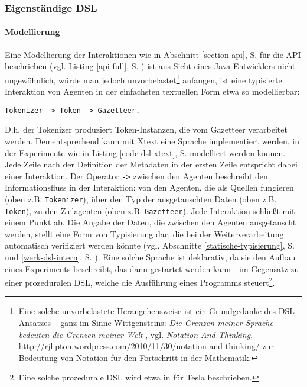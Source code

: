 \documentclass[abstracton, 12pt]{scrartcl}
\begin{document}
\subsubsection{Eigenständige DSL} \label{werk-dsl-extern}  

\paragraph{Modellierung}

Eine Modellierung der Interaktionen wie in Abschnitt \ref{section-api}, S. \pageref{section-api} für die API beschrieben (vgl. Listing \ref{api-full}, S. \pageref{api-full}) ist aus Sicht eines Java-Entwicklers nicht ungewöhnlich, würde man jedoch unvorbelastet\footnote{Eine solche unvorbelastete Herangehensweise ist ein Grundgedanke des DSL-Ansatzes -- ganz im Sinne Wittgensteins: \emph{Die Grenzen meiner Sprache bedeuten die Grenzen meiner Welt} \citep{Wittgenstein1922}, vgl. \emph{Notation And Thinking}, \url{http://rjlipton.wordpress.com/2010/11/30/notation-and-thinking/} zur Bedeutung von Notation für den Fortschritt in der Mathematik.} anfangen, ist eine typisierte Interaktion von Agenten in der einfachsten textuellen Form etwa so modellierbar: 

\begin{lstlisting}
Tokenizer -> Token -> Gazetteer.
\end{lstlisting}

D.h. der Tokenizer produziert Token-Instanzen, die vom Gazetteer verarbeitet werden. Dem\-ent\-sprech\-end kann mit Xtext eine Sprache implementiert werden, in der Experimente wie in Listing \ref{code-dsl-xtext}, S. \pageref{code-dsl-xtext} modelliert werden können. Jede Zeile nach der Definition der Metadaten in der ersten Zeile entspricht dabei einer Interaktion. Der Operator \lstinline!->! zwischen den Agenten beschreibt den Informationsfluss in der Interaktion: von den Agenten, die als Quellen fungieren (oben z.B. \lstinline!Tokenizer!), über den Typ der ausgetauschten Daten (oben z.B. \lstinline!Token!), zu den Zielagenten (oben z.B. \lstinline!Gazetteer!). Jede Interaktion schließt mit einem Punkt ab. Die Angabe der Daten, die zwischen den Agenten ausgetauscht werden, stellt eine Form von Typisierung dar, die bei der Weiterverarbeitung automatisch verifiziert werden könnte (vgl. Abschnitte \ref{statische-typisierung}, S. \pageref{statische-typisierung} und \ref{werk-dsl-intern}, S. \pageref{werk-dsl-intern}). Eine solche Sprache ist deklarativ, da sie den Aufbau eines Experiments beschreibt, das dann gestartet werden kann - im Gegensatz zu einer prozeduralen DSL, welche die Ausführung eines Programms steuert\footnote{Eine solche prozedurale DSL wird etwa in \citet{Bilagher2006} für Tesla beschrieben.}.
\end{document}
